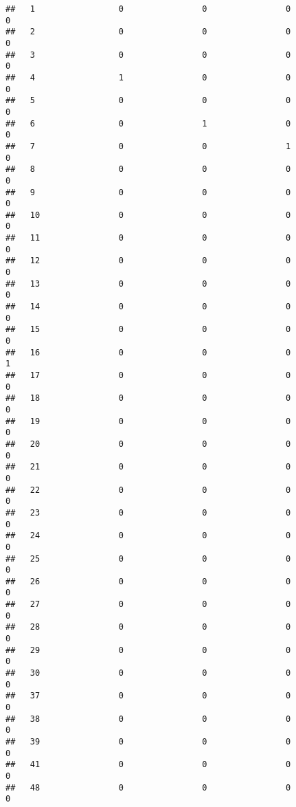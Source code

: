 \documentclass[]{article}
\begin{document}
\begin{verbatim}
##   1                 0                0                0                0
##   2                 0                0                0                0
##   3                 0                0                0                0
##   4                 1                0                0                0
##   5                 0                0                0                0
##   6                 0                1                0                0
##   7                 0                0                1                0
##   8                 0                0                0                0
##   9                 0                0                0                0
##   10                0                0                0                0
##   11                0                0                0                0
##   12                0                0                0                0
##   13                0                0                0                0
##   14                0                0                0                0
##   15                0                0                0                0
##   16                0                0                0                1
##   17                0                0                0                0
##   18                0                0                0                0
##   19                0                0                0                0
##   20                0                0                0                0
##   21                0                0                0                0
##   22                0                0                0                0
##   23                0                0                0                0
##   24                0                0                0                0
##   25                0                0                0                0
##   26                0                0                0                0
##   27                0                0                0                0
##   28                0                0                0                0
##   29                0                0                0                0
##   30                0                0                0                0
##   37                0                0                0                0
##   38                0                0                0                0
##   39                0                0                0                0
##   41                0                0                0                0
##   48                0                0                0                0

\end{verbatim}
\end{document}
